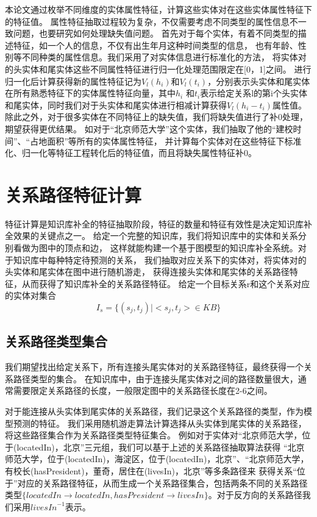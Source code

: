 本论文通过枚举不同维度的实体属性特征，计算这些实体对在这些实体属性特征下的特征值。
属性特征抽取过程较为复杂，不仅需要考虑不同类型的属性信息不一致问题，也要研究如何处理缺失值问题。
首先对于每个实体，有着不同类型的描述特征，如一个人的信息，不仅有出生年月这种时间类型的信息，
也有年龄、性别等不同种类的属性信息。我们采用了对实体信息进行标准化的方法，
将实体对的头实体和尾实体这些不同属性特征进行归一化处理范围限定在[0，1]之间。
进行归一化后计算获得新的属性特征记为$V_l(h_i)$和$V_l (t_i)$，分别表示头实体和尾实体在所有熟悉特征下的实体属性特征向量，其中$h_i$ 和$t_i$表示给定关系l的第i个头实体和尾实体，同时我们对于头实体和尾实体进行相减计算获得$V_l(h_i-t_i )$属性值。除此之外，对于很多实体在不同特征上的缺失值，我们将缺失值进行了补0处理，期望获得更优结果。
如对于“北京师范大学”这个实体，我们抽取了他的“建校时间”、“占地面积”等所有的实体属性特征，
并计算每个实体对在这些特征下标准化、归一化等特征工程转化后的特征值，而且将缺失属性特征补0。

\section{关系路径特征计算}
\label{sec:relational-compute}
特征计算是知识库补全的特征抽取阶段，特征的数量和特征有效性是决定知识库补全效果的关键点之一。
给定一个完整的知识库，我们将知识库中的实体和关系分别看做为图中的顶点和边，
这样就能构建一个基于图模型的知识库补全系统。对于知识库中每种特定待预测的关系，
我们抽取对应关系下的实体对，将实体对的头实体和尾实体在图中进行随机游走\cite{Lao2012}，
获得连接头实体和尾实体的关系路径特征，从而获得了知识库补全的关系路径特征。
给定一个目标关系r和这个关系对应的实体对集合
$$I_s=\{(s_j,t_j)|<s_j,t_j> \in KB\}$$


\subsection{关系路径类型集合}
\label{sec:relational-set}
我们期望找出给定关系下，所有连接头尾实体对的关系路径特征，最终获得一个关系路径类型的集合。
在知识库中，由于连接头尾实体对之间的路径数量很大，通常需要限定关系路径的长度，一般限定图中的关系路径长度在2-6之间。

对于能连接从头实体到尾实体的关系路径，我们记录这个关系路径的类型，作为模型预测的特征。
我们采用随机游走算法\cite{Lovsz1993RandomWO}计算选择从头实体到尾实体的关系路径，将这些路径集合作为关系路径类型特征集合。
例如对于实体对“北京师范大学，位于(locatedIn)，北京”三元组，我们可以基于上述的关系路径抽取算法获得
“北京师范大学，位于(locatedIn)，海淀区，位于(locatedIn)，北京”、“北京师范大学，有校长(hasPresident)，董奇，居住在(livesIn)，北京”等多条路径来
获得关系“位于”对应的关系路径特征，从而生成一个关系路径集合，包括两条不同的关系路径类型$\{locatedIn\to locatedIn, hasPresident \to livesIn\}$。对于反方向的关系路径我们采用${livesIn}^{-1}$表示。

